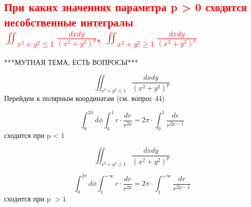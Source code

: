 
\textcolor{red}{\subsection{При каких значениях параметра p > 0 сходятся несобственные интегралы\\ $\iint_{x^2 + y^2 \leqslant 1}\frac{dxdy}{(x^2 + y^2)^p}$, $\iint_{x^2 + y^2 \geqslant 1}\frac{dxdy}{(x^2 + y^2)^p}$}}

***МУТНАЯ ТЕМА, ЕСТЬ ВОПРОСЫ***

\[\iint_{x^2 + y^2 \leqslant 1}\frac{dxdy}{(x^2 + y^2)^p}\]
Перейдем к полярным координатам (см. вопрос 44)

\[\int_{0}^{2\pi}d\phi\int_{0}^{1}r \cdot \frac{dr}{r^{2p}} = 2\pi\cdot\int_{0}^{1}\frac{dr}{r^{2p - 1}}\]
сходится при p < $1$

\[\iint_{x^2 + y^2 \geqslant 1}\frac{dxdy}{(x^2 + y^2)^p}\]

\[\int_{0}^{2\pi}d\phi\int_{1}^{+\infty}r \cdot \frac{dr}{r^{2p}} = 2\pi\cdot\int_{1}^{+\infty}\frac{dr}{r^{2p-1}}\]
сходится при p $>1$

